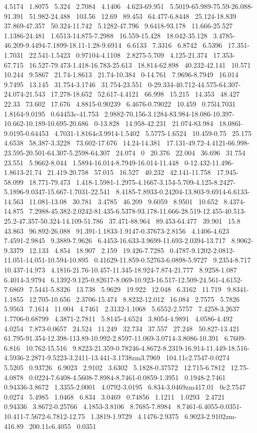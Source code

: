 \documentclass{article}
\begin{document}
4.5174~ 1.8075~ 5.324~ 2.7084~ 4.1406~ 4.623-69.951~ 5.5019-65.989-75.59-26.088-91.391~ 51.982-24.488~ 103.56~ 12.69~ 89.453~ 64.477-6.8448~ 25.124-18.839~ 37.869-47.357~ 50.324-11.742~ 5.1282-47.796~ 9.6418-93.178~ 11.666-25.527~ 1.1386-24.481~ 1.6513-14.875-7.2988~ 16.559-15.428~ 18.042-35.128~ 3.4785-46.209-9.4494-7.1899-18.11-1.28-9.6914~ 6.6133~ 7.3316~ 6.8742~ 6.5396~ 17.351-1.7031~ 22.541-1.5423~ 0.97104-4.1108~ 2.8275-5.709~ 4.125-21.374~ 17.353-67.715~ 16.527-79.473-1.418-16.783-25.613~ 18.814-62.898~ 40.232-42.141~ 10.571~ 10.244~ 9.5867~ 21.74-1.8613~ 21.74-10.384~ 0-14.761~ 7.9696-8.7949~ 16.014~ 9.7495~ 13.145~ 31.754-3.1746~ 31.754-23.551~ 0-29.334-40.712-44.575-64.307-24.074-21.543~ 17.278-18.652~ 52.617-4.4121~ 66.998~ 15.215~ 14.353~ 48.427~ 22.33~ 73.602~ 17.676~ 4.8815-0.90239~ 6.4676-0.79022~ 10.459~ 0.75l4.7031~ 1.8164-9.0195~ 0.64453c-41.753~ 2.9882-70.156-3.1284-83.984-18.086-10.397-10.662-10.189-10.695-20.686~ 0-13.828~ 14.958-42.231~ 21.074-83.984~ 18.086l-9.0195-0.64453~ 4.7031-1.8164c3.9914-1.5402~ 5.5775-1.6524~ 10.459-0.75~ 25.175~ 4.6538~ 58.387-3.3228~ 73.602-17.676~ 14.24-14.381~ 17.131-49.72-4.4121-66.998-23.595-20.501-64.307-5.2598-64.307~ 24.074~ 0~ 20.376~ 22.004~ 36.696~ 31.754~ 23.551~ 5.9662-8.044~ 1.5894-16.014-8.7949-16.014-11.448~ 0-12.432-11.496-1.8613-21.74~ 21.419-20.758~ 57.015~ 16.527~ 40.232~ 42.141-11.758~ 17.945-58.099~ 18.771-79.473~ 1.418-1.5981-1.2975-4.1667-3.154-5.709-4.125-8.2427-5.1896-9.0347-15.667-1.7031-22.541~ 8.4185-7.8933-0.24204-13.803-9.6914-6.6133-14.563~ 11.081-13.08~ 30.781~ 3.4785~ 46.209~ 9.6059~ 8.9501~ 10.652~ 8.4374-14.875~ 7.2988-45.382-2.0242-81.435-6.5378-93.178-11.666-28.519-12.455-40.513-25.2-47.357-50.324-14.109-51.786~ 37.471-88.964~ 89.453-64.477~ 39.901~ 15.8~ 43.863~ 96.892-26.088~ 91.391-1.1833-1.9147-0.37673-2.8156~ 4.1406-4.623~ 7.4591-2.9845~ 9.3889-7.9626~ 6.4453-16.633-3.9699-11.693-2.0394-13.717~ 8.9062-9.3379~ 12.133~ 4.854~ 18.907~ 2.159~ 19.426-7.7285~ 0.4787-9.1202-2.0812-11.051-14.051-10.594-10.895~ 0.41629-11.859-0.52763-6.0898-5.9727~ 9.2354-8.717~ 10.437-14.973~ 4.1816-21.76-10.457-11.345-18.924-7.874-21.777~ 8.9258-1.087~ 6.4014-3.9794~ 6.1392-9.125-0.82617-8.069-10.923-16.517-12.509-24.561-4.6152-7.6869~ 7.5441-5.8326~ 13.738~ 5.9629~ 19.922~ 12.048~ 6.3162~ 11.719~ 9.8341-1.1855~ 12.705-10.656~ 2.3706-15.474~ 8.8232-12.012~ 16.084~ 2.7575~ 5.7826~ 5.9563~ 7.1614~ 11.004~ 4.7461~ 2.3132-1.1068~ 5.6552-2.5757~ 7.4258-3.2637~ 1.7706-0.68799~ 4.3871-2.7811~ 5.8145-4.6524~ 3.8054-4.9891~ 4.0586-4.492~ 4.0254~ 7.873-0.0657~ 24.524~ 11.249~ 32.734~ 37.557~ 27.248~ 50.827-13.421~ 61.795-91.354-12.398-113.89-10.992-2.8597-11.069-3.0714-3.8086-10.391~ 6.7609-6.816~ 10.762-15.516~ 9.8223-21.359-0.78246-4.8672-8.2319-16.914-11.449-18.516-4.5936-2.2871-9.5223-3.2411-13.441-3.1738zm3.7969~ 104.11c2.7547-0.0274~ 5.5205~ 0.93726~ 6.9023~ 2.9102~ 3.6302~ 5.1828-0.37572~ 12.715-6.7812~ 12.75-4.0878~ 0.0224-7.6408-4.5608-7.8984-8.7461-0.0859-1.3951~ 0.1948-2.7461~ 0.94336-3.8672~ 1.3355-2.0001~ 4.0792-3.0195~ 6.834-3.0469zm417.01~ 0c2.7547~ 0.0274~ 5.4985~ 1.0468~ 6.834~ 3.0469~ 0.74856~ 1.1211~ 1.0293~ 2.4721~ 0.94336~ 3.8672-0.25766~ 4.1853-3.8106~ 8.7685-7.8984~ 8.7461-6.4055-0.0351-10.411-7.5672-6.7812-12.75~ 1.3819-1.9729~ 4.1476-2.9375~ 6.9023-2.9102zm-416.89~ 200.11c6.4055~ 0.0351~ 
\end{document}
